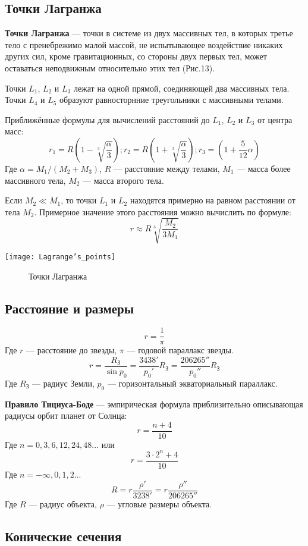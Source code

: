 \documentclass[10pt,a5paper]{article}
\begin{document}
\subsection{Точки Лагранжа}

\textbf{Точки Лагранжа} --- точки в системе из двух массивных тел, в которых третье тело с пренебрежимо малой массой, не испытывающее воздействие никаких других сил, кроме гравитационных, со стороны двух первых тел, может оставаться неподвижным относительно этих тел (Рис.13).

Точки $L_1$, $L_2$ и $L_3$ лежат на одной прямой, соединяющей два массивных тела. Точки $L_4$ и $L_5$ образуют равносторнние треугольники с массивными телами.

Приближённые формулы для вычислений расстояний до $L_1$, $L_2$ и $L_3$ от центра масс:
$$r_1=R\left(1-\sqrt[3]{\frac{\alpha}{3}}\right); r_2=R\left(1+\sqrt[3]{\frac{\alpha}{3}}\right); r_3=\left(1+\frac{5}{12}\alpha\right)$$
Где $\alpha=M_1/(M_2+M_3)$, $R$ --- расстояние между телами, $M_1$ --- масса более массивного тела, $M_2$ --- масса второго тела.

Если $M_2\ll M_1$, то точки $L_1$ и $L_2$ находятся примерно на равном расстоянии от тела $M_2$. Примерное значение этого расстояния можно вычислить по формуле:
$$r\approx R\sqrt[3]{\frac{M_2}{3M_1}}$$
\begin{center}
\texttt{[image: Lagrange's\_points]}
\begin{figure}[h!]
\caption{Точки Лагранжа}
\end{figure}
\end{center}
\subsection{Расстояние и размеры}
$$r=\frac{1}{\pi}$$
Где $r$ --- расстояние до звезды, $\pi$ --- годовой параллакс звезды.
$$r=\frac{R_{\text{З}}}{\sin p_0}=\frac{3438'}{p_0'}R_{\text{З}}=\frac{206265''}{p_0''}R_{\text{З}}$$
Где $R_{\text{З}}$ --- радиус Земли, $p_0$ --- горизонтальный экваториальный параллакс.

\textbf{Правило Тициуса-Боде} --- эмпирическая формула приблизительно описывающая радиусы орбит планет от Солнца:
$$r=\frac{n+4}{10}$$
Где $n=0, 3 ,6, 12, 24, 48...$ или
$$r=\frac{3\cdot 2^n+4}{10}$$
Где $n=-\infty, 0, 1, 2...$
$$R=r\frac{\rho'}{3238'}=r\frac{\rho''}{206265''}$$
Где $R$ --- радиус объекта, $\rho$ --- угловые размеры объекта.
\begin{center}
\section{Конические сечения}
\end{center}
\end{document}
